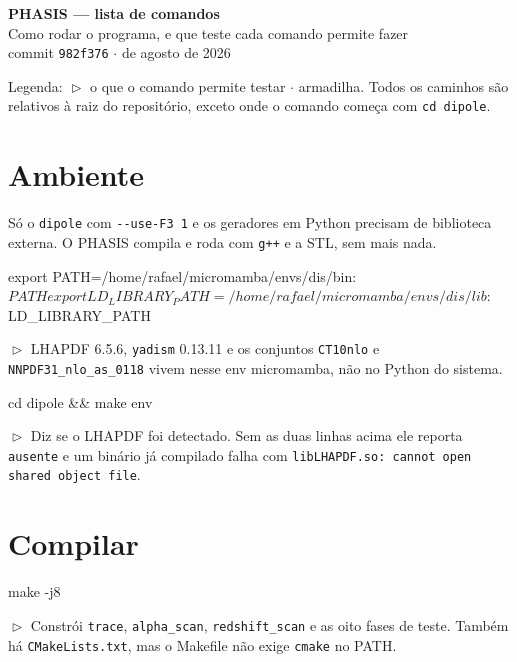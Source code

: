 \documentclass[10pt,a4paper]{article}
\newcommand{\teste}[1]{%
  \par\vspace{1pt}\noindent
  {\color{verde}\footnotesize$\vartriangleright$}\hspace{3pt}%
  {\color{cinza}\footnotesize #1}\par\vspace{7pt}}
\begin{document}
\begin{center}
{\LARGE\bfseries PHASIS --- lista de comandos}\\[3pt]
{\color{cinza}Como rodar o programa, e que teste cada comando permite fazer}\\[2pt]
{\footnotesize\color{cinza}commit \texttt{982f376} \quad$\cdot$ de agosto de 2026}
\end{center}

\vspace{4pt}

{\color{cinza}\small
Legenda: {\color{verde}$\vartriangleright$} o que o comando permite testar
\quad $\cdot$ \quad {\color{ferrugem}$\blacktriangleright$} armadilha.
Todos os caminhos são relativos à raiz do repositório, exceto onde o
comando começa com \texttt{cd dipole}.}

\section{Ambiente}

Só o \texttt{dipole} com \texttt{-{}-use-F3 1} e os geradores em Python
precisam de biblioteca externa. O PHASIS compila e roda com \texttt{g++}
e a STL, sem mais nada.

\begin{comando}
export PATH=/home/rafael/micromamba/envs/dis/bin:$PATH
export LD_LIBRARY_PATH=/home/rafael/micromamba/envs/dis/lib:$LD_LIBRARY_PATH
\end{comando}
\teste{LHAPDF 6.5.6, \texttt{yadism} 0.13.11 e os conjuntos
\texttt{CT10nlo} e \texttt{NNPDF31\_nlo\_as\_0118} vivem nesse env
micromamba, não no Python do sistema.}

\begin{comando}
cd dipole && make env
\end{comando}
\teste{Diz se o LHAPDF foi detectado. Sem as duas linhas acima ele
reporta \texttt{ausente} e um binário já compilado falha com
\texttt{libLHAPDF.so: cannot open shared object file}.}

\section{Compilar}

\begin{comando}
make -j8
\end{comando}
\teste{Constrói \texttt{trace}, \texttt{alpha\_scan},
\texttt{redshift\_scan} e as oito fases de teste. Também há
\texttt{CMakeLists.txt}, mas o Makefile não exige \texttt{cmake} no
PATH.}
\end{document}
